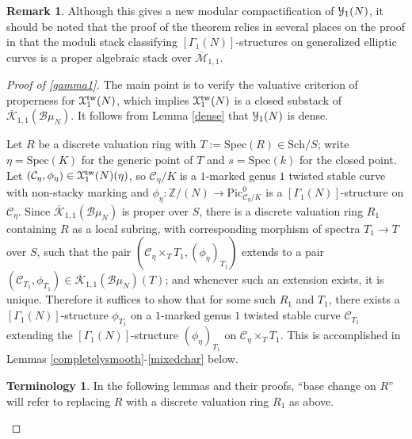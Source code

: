 \documentclass[11pt]{amsart}
\theoremstyle{definition}
\newtheorem{remark}[subsection]{Remark}
\newtheorem{terminology}[subsection]{Terminology}
\begin{document}
\begin{remark}
Although this gives a new modular compactification of ${\mathbf{\EuScript{Y}}}_1(N)$, it should be noted that the proof of the theorem relies in several places on the proof in \cite{C} that the moduli stack classifying $[\Gamma_1(N)]$-structures on generalized elliptic curves is a proper algebraic stack over $\overline{\mathcal{M}}_{1,1}$.
\end{remark}

\begin{proof}[Proof of \ref{gamma1}]
The main point is to verify the valuative criterion of properness for ${\mathbf{\EuScript{X}}}^{\mathrm{tw}}_1(N)$, which implies ${\mathbf{\EuScript{X}}}^{\mathrm{tw}}_1(N)$ is a closed substack of $\overline{\mathcal{K}}_{1,1}({\mathcal{B}} \mu_N)$. It follows from Lemma \ref{dense} that ${\mathbf{\EuScript{Y}}}_1(N)$ is dense.

Let $R$ be a discrete valuation ring with $T := \mathrm{Spec}(R) \in \mathrm{Sch}/S$; write $\eta = \mathrm{Spec}(K)$ for the generic point of $T$ and $s = \mathrm{Spec}(k)$ for the closed point. Let $({\mathcal{C}}_\eta,\phi_\eta) \in {\mathbf{\EuScript{X}}}^{\mathrm{tw}}_1(N)(\eta)$, so ${\mathcal{C}}_\eta/K$ is a $1$-marked genus $1$ twisted stable curve with non-stacky marking and $\phi_\eta:\mathbb{Z}/(N) \rightarrow \mathrm{Pic}^0_{{\mathcal{C}}_\eta/K}$ is a $[\Gamma_1(N)]$-structure on ${\mathcal{C}}_\eta$. Since $\overline{\mathcal{K}}_{1,1}({\mathcal{B}}\mu_N)$ is proper over $S$, there is a discrete valuation ring $R_1$ containing $R$ as a local subring, with corresponding morphism of spectra $T_1 \rightarrow T$ over $S$, such that the pair $({\mathcal{C}}_\eta \times_T T_1, (\phi_\eta)_{T_1})$ extends to a pair $({\mathcal{C}}_{T_1}, \phi_{T_1}) \in \overline{\mathcal{K}}_{1,1}({\mathcal{B}} \mu_N)(T)$; and whenever such an extension exists, it is unique. Therefore it suffices to show that for some such $R_1$ and $T_1$, there exists a $[\Gamma_1(N)]$-structure $\phi_{T_1}$ on a $1$-marked genus $1$ twisted stable curve ${\mathcal{C}}_{T_1}$ extending the $[\Gamma_1(N)]$-structure $(\phi_\eta)_{T_1}$ on ${\mathcal{C}}_\eta \times_T T_1$. This is accomplished in Lemmas \ref{completelysmooth}-\ref{mixedchar} below.

\begin{terminology}
In the following lemmas and their proofs, ``base change on $R$'' will refer to replacing $R$ with a discrete valuation ring $R_1$ as above.
\end{terminology}


\end{proof}
\end{document}
